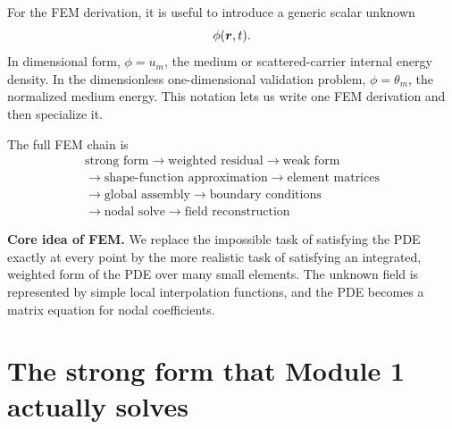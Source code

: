 \documentclass[11pt]{article}
\begin{document}
For the FEM derivation, it is useful to introduce a generic scalar unknown
\begin{equation}
    \phi(\bm{r},t).
\end{equation}
In dimensional form, \(\phi=u_m\), the medium or scattered-carrier internal energy density. In the dimensionless one-dimensional validation problem, \(\phi=\theta_m\), the normalized medium energy. This notation lets us write one FEM derivation and then specialize it.

The full FEM chain is
\begin{equation}
\boxed{\begin{gathered}
\text{strong form}\rightarrow\text{weighted residual}\rightarrow\text{weak form}\\
\rightarrow\text{shape-function approximation}\rightarrow\text{element matrices}\\
\rightarrow\text{global assembly}\rightarrow\text{boundary conditions}\\
\rightarrow\text{nodal solve}\rightarrow\text{field reconstruction}
\end{gathered}}
\end{equation}

\begin{physicsbox}
\textbf{Core idea of FEM.} We replace the impossible task of satisfying the PDE exactly at every point by the more realistic task of satisfying an integrated, weighted form of the PDE over many small elements. The unknown field is represented by simple local interpolation functions, and the PDE becomes a matrix equation for nodal coefficients.
\end{physicsbox}

\section{The strong form that Module 1 actually solves}
\end{document}
